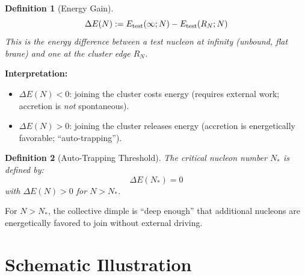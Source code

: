 \documentclass[11pt,a4paper]{article}
\newtheorem{definition}{Definition}
\begin{document}
\begin{definition}[Energy Gain]
\begin{equation}
\Delta E(N) := E_{\rm test}(\infty; N) - E_{\rm test}(R_N; N)
\label{eq:deltaE}
\end{equation}
This is the energy difference between a test nucleon at infinity
(unbound, flat brane) and one at the cluster edge $R_N$.
\end{definition}

\textbf{Interpretation:}
\begin{itemize}
\item $\Delta E(N) < 0$: joining the cluster costs energy (requires
external work; accretion is \textit{not} spontaneous).
\item $\Delta E(N) > 0$: joining the cluster releases energy (accretion
is energetically favorable; ``auto-trapping'').
\end{itemize}

\begin{definition}[Auto-Trapping Threshold]
\label{def:threshold}
The critical nucleon number $N_*$ is defined by:
\begin{equation}
\boxed{\Delta E(N_*) = 0}
\label{eq:nstar}
\end{equation}
with $\Delta E(N) > 0$ for $N > N_*$.
\end{definition}

For $N > N_*$, the collective dimple is ``deep enough'' that additional
nucleons are energetically favored to join without external driving.

\section{Schematic Illustration}
\end{document}
